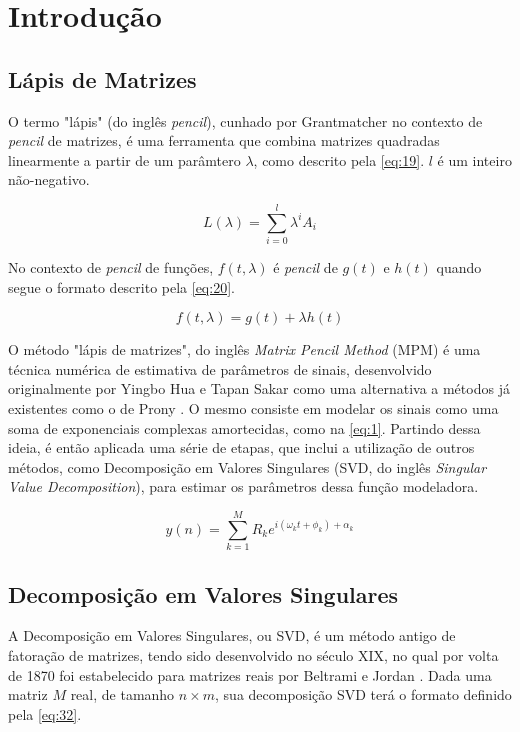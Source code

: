 \documentclass[12pt]{article}
\begin{document}
\section{Introdução}

\subsection{Lápis de Matrizes}

O termo "lápis" (do inglês \textit{pencil}), cunhado por Grantmatcher \cite{} no contexto de \textit{pencil} de matrizes, é uma ferramenta que combina matrizes 
quadradas linearmente a partir de um parâmtero $\lambda$, como descrito pela \autoref{eq:19}. $l$ é um inteiro não-negativo.

\begin{equation} \label{eq:19}
    L(\lambda) = \sum_{i = 0}^{l} \lambda^i A_i
\end{equation}

No contexto de \textit{pencil} de funções, $f(t, \lambda)$ é \textit{pencil} de $g(t)$ e $h(t)$ quando segue o formato descrito pela \autoref{eq:20}.

\begin{equation} \label{eq:20}
    f(t, \lambda) = g(t) + \lambda h(t)
\end{equation}

O método "lápis de matrizes", do inglês \textit{Matrix Pencil Method} (MPM) é uma técnica numérica
de estimativa de parâmetros de sinais, desenvolvido originalmente por Yingbo Hua e Tapan Sakar \cite{370583} como uma alternativa a métodos já existentes 
como o de Prony \cite{49090}. O mesmo consiste em modelar os sinais como uma soma de exponenciais complexas amortecidas, como na \autoref{eq:1}. Partindo 
dessa ideia, é então aplicada uma série de etapas, que inclui a utilização de outros métodos, como Decomposição em Valores Singulares (SVD, do inglês \textit{Singular Value Decomposition}), 
para estimar os parâmetros dessa função modeladora.  

\begin{equation} \label{eq:1}
    y(n) = \sum_{k=1}^{M} R_k e^{i (\omega_k t + \phi_k) + \alpha_k }
\end{equation}

\subsection{Decomposição em Valores Singulares}

A Decomposição em Valores Singulares, ou SVD, é um método antigo de fatoração de matrizes, tendo sido desenvolvido no século XIX, no qual por volta de 1870 
foi estabelecido para matrizes reais por Beltrami e Jordan \cite{LIANG2002527}. Dada uma matriz $M$ real, de tamanho $n \times m$, sua decomposição SVD terá o 
formato definido pela \autoref{eq:32}.
\end{document}
